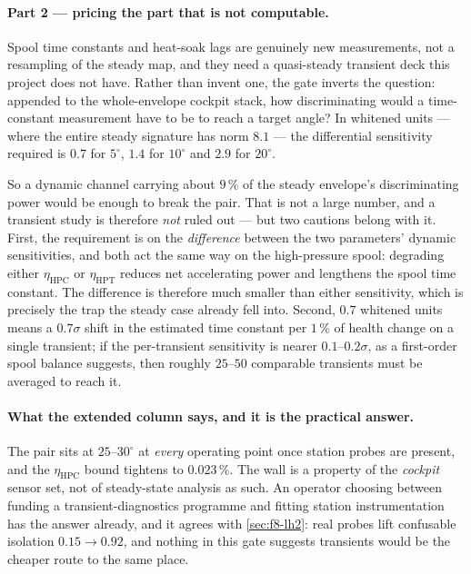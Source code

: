 \paragraph{Part 2 --- pricing the part that is not computable.} Spool time constants and
heat-soak lags are genuinely new measurements, not a resampling of the steady map, and they
need a quasi-steady transient deck this project does not have. Rather than invent one, the gate
inverts the question: appended to the whole-envelope cockpit stack, how discriminating would a
time-constant measurement have to be to reach a target angle? In whitened units --- where the
entire steady signature has norm $8.1$ --- the differential sensitivity required is
$\mathbf{0.7}$ for $5^{\circ}$, $1.4$ for $10^{\circ}$ and $2.9$ for $20^{\circ}$.

So a dynamic channel carrying about $9\,\%$ of the steady envelope's discriminating power
would be enough to break the pair. That is not a large number, and a transient study is
therefore \emph{not} ruled out --- but two cautions belong with it. First, the requirement is on
the \emph{difference} between the two parameters' dynamic sensitivities, and both act the same
way on the high-pressure spool: degrading either $\eta_{\mathrm{HPC}}$ or $\eta_{\mathrm{HPT}}$
reduces net accelerating power and lengthens the spool time constant. The difference is
therefore much smaller than either sensitivity, which is precisely the trap the steady case
already fell into. Second, $0.7$ whitened units means a $0.7\sigma$ shift in the estimated time
constant per $1\,\%$ of health change on a single transient; if the per-transient sensitivity
is nearer $0.1$--$0.2\sigma$, as a first-order spool balance suggests, then roughly
$25$--$50$ comparable transients must be averaged to reach it.

\paragraph{What the extended column says, and it is the practical answer.} The pair sits at
$25$--$30^{\circ}$ at \emph{every} operating point once station probes are present, and the
$\eta_{\mathrm{HPC}}$ bound tightens to $0.023\,\%$. The wall is a property of the
\emph{cockpit} sensor set, not of steady-state analysis as such. An operator choosing between
funding a transient-diagnostics programme and fitting station instrumentation has the answer
already, and it agrees with \cref{sec:f8-lh2}: real probes lift confusable isolation
$0.15 \to 0.92$, and nothing in this gate suggests transients would be the cheaper route to the
same place.

